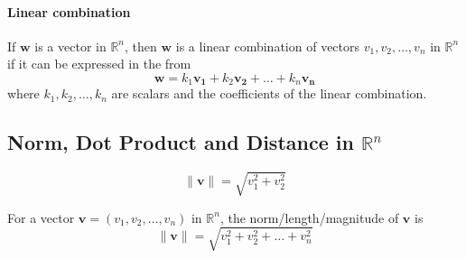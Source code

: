 \documentclass[../linear-algebra.tex]{subfiles}
\begin{document}
\paragraph{Linear combination}
If $\mathbf{w}$ is a vector in $\mathbb{R}^n$, then $\mathbf{w}$ is a linear
combination of vectors $v_1, v_2,\ldots, v_n$ in $\mathbb{R}^n$ if it can be
expressed in the from
\[\mathbf{w} = k_1\mathbf{v_1} + k_2\mathbf{v_2} +\ldots + k_n\mathbf{v_n}\]
where $k_1, k_2, \ldots, k_n$ are scalars and the coefficients of the linear combination.

\subsection{Norm, Dot Product and Distance in $\mathbb{R}^n$}

\begin{center}
    \begin{minipage}{0.7\textwidth}
        \centering
        
        \begin{minipage}{0.5\textwidth}
            \centering
        \end{minipage}
        \hfill
        \begin{minipage}{0.4\textwidth}
            \centering
            \[
            \|\mathbf{v}\| = \sqrt{v_1^2 + v_2^2}
            \]
        \end{minipage}
    \end{minipage}
\end{center}

\noindent For a vector $\mathbf{v} = (v_1, v_2,\ldots, v_n)$ in $\mathbb{R}^n$,
the norm/length/magnitude of $\mathbf{v}$ is
\[\|\mathbf{v}\| = \sqrt{v_1^2 + v_2^2 + \dots + v_n^2}\]
\end{document}

